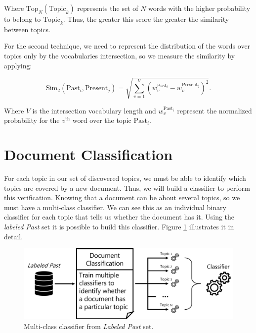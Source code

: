 Where $\text{Top}_{N}(\text{Topic}_{k})$ represents the set of $N$ words with the higher probability to belong to $\text{Topic}_{k}$. Thus, the greater this score the greater the similarity between topics.

For the second technique, we need to represent the distribution of the words over topics only by the vocabularies intersection, so we measure the similarity by applying:

\begin{equation}
	\label{eq:global-match}
	\text{Sim}_{2}\left(\text{Past}_{i}, \text{Present}_{j}\right) = \sqrt{\sum_{v=1}^{V} \left(w_{v}^{\text{Past}_{i}} - w_{v}^{\text{Present}_{j}}\right)^2} \text{.}
\end{equation}

Where $V$ is the intersection vocabulary length and $w_{v}^{\text{Past}_{i}}$ represent the normalized probability for the $v^{\text{th}}$ word over the topic $\text{Past}_{i}$.

\section{Document Classification}

For each topic in our set of discovered topics, we must be able to identify which topics are covered by a new document. Thus, we will build a classifier to perform this verification. Knowing that a document can be about several topics, so we must have a multi-class classifier. We can see this as an individual binary classifier for each topic that tells us whether the document has it. Using the \textit{labeled Past} set it is possible to build this classifier. Figure \ref{fig:document-classification} illustrates it in detail.

\begin{figure}[h!]
	\centering
	\includegraphics[width=0.9\linewidth]{01.Chapters/04.Materials/document-classification}
	\caption{Multi-class classifier from \textit{Labeled Past} set.}
	\label{fig:document-classification}
\end{figure}

